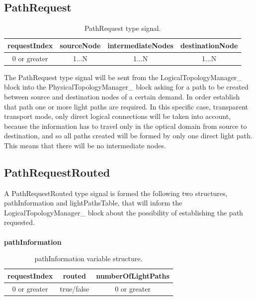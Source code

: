 \subsection{PathRequest}

\begin{table}[H]
	\centering
	\begin{tabular}{|c|c|c|c|}
		\hline
		requestIndex & sourceNode & intermediateNodes & destinationNode\\ \hline
		0 or greater & 1...N      & 1...N             & 1...N          \\ \hline
	\end{tabular}
	\caption{PathRequest type signal.}
	\label{PathRequest}
\end{table}

The PathRequest type signal will be sent from the LogicalTopologyManager\_  block into the PhysicalTopologyManager\_  block asking for a path to be created between source and destination nodes of a certain demand. In order establish that path one or more light paths are required. In this specific case, transparent transport mode, only direct logical connections will be taken into account, because the information has to travel only in the optical domain from source to destination, and so all paths created will be formed by only one direct light path. This means that there will be no intermediate nodes. %



\subsection{PathRequestRouted}

A PathRequestRouted type signal is formed the following two structures, pathInformation and lightPathsTable, that will inform the LogicalTopologyManager\_  block about the possibility of establishing the path requested.\\ \\
\textbf{pathInformation}  
\begin{table}[H]
	\centering
	\begin{tabular}{|c|c|c|}
		\hline
		requestIndex & routed & numberOfLightPaths \\ \hline
		0 or greater & true/false & 0 or greater \\ \hline
	\end{tabular}
	\caption{pathInformation variable structure.}
	\label{pathInformation}
\end{table}


